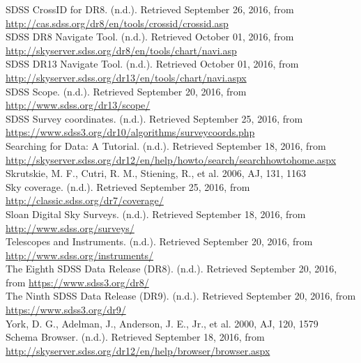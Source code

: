 \documentclass[10pt,letterpaper]{article}
\begin{document}
\begin{thebibliography}{1}
 SDSS CrossID for DR8. (n.d.). Retrieved September 26, 2016, from \url{http://cas.sdss.org/dr8/en/tools/crossid/crossid.asp}\\

 SDSS DR8 Navigate Tool. (n.d.). Retrieved October 01, 2016, from \url{http://skyserver.sdss.org/dr8/en/tools/chart/navi.asp}\\

 SDSS DR13 Navigate Tool. (n.d.). Retrieved October 01, 2016, from \url{http://skyserver.sdss.org/dr13/en/tools/chart/navi.aspx}\\

 SDSS Scope. (n.d.). Retrieved September 20, 2016, from \url{http://www.sdss.org/dr13/scope/}\\

 SDSS Survey coordinates. (n.d.). Retrieved September 25, 2016, from \url{https://www.sdss3.org/dr10/algorithms/surveycoords.php}\\

 Searching for Data: A Tutorial. (n.d.). Retrieved September 18, 2016, from \url{http://skyserver.sdss.org/dr12/en/help/howto/search/searchhowtohome.aspx}\\

 Skrutskie, M. F., Cutri, R. M., Stiening, R., et al. 2006, AJ, 131, 1163\\

 Sky coverage. (n.d.). Retrieved September 25, 2016, from \url{http://classic.sdss.org/dr7/coverage/}\\

 Sloan Digital Sky Surveys. (n.d.). Retrieved September 18, 2016, from \url{http://www.sdss.org/surveys/}\\

 Telescopes and Instruments. (n.d.). Retrieved September 20, 2016, from \url{http://www.sdss.org/instruments/}\\

 The Eighth SDSS Data Release (DR8). (n.d.). Retrieved September 20, 2016, from \url{https://www.sdss3.org/dr8/}\\

 The Ninth SDSS Data Release (DR9). (n.d.). Retrieved September 20, 2016, from \url{https://www.sdss3.org/dr9/}\\

 York, D. G., Adelman, J., Anderson, J. E., Jr., et al. 2000, AJ, 120, 1579\\

 Schema Browser. (n.d.). Retrieved September 18, 2016, from \url{http://skyserver.sdss.org/dr12/en/help/browser/browser.aspx}\\

\end{thebibliography}
\end{document}
